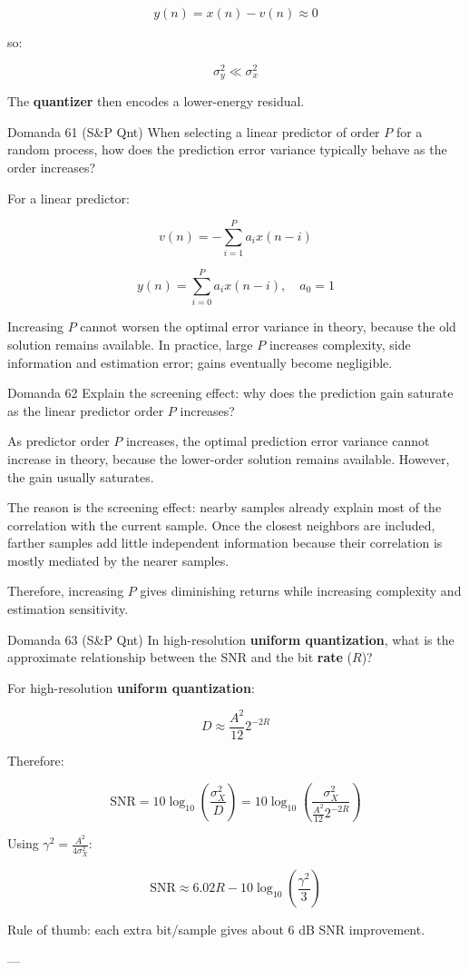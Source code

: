 $$
y(n)=x(n)-v(n)\approx 0
$$


so:


$$
\sigma_y^2 \ll \sigma_x^2
$$


The \textbf{quantizer} then encodes a lower-energy residual.



\begin{questionbox}{Domanda 61}
(S\&P Qnt) When selecting a linear predictor of order $P$ for a random process, how does the prediction error variance typically behave as the order increases?
\end{questionbox}


For a linear predictor:


$$
v(n)=-\sum_{i=1}^{P}a_i x(n-i)
$$



$$
y(n)=\sum_{i=0}^{P}a_i x(n-i),\quad a_0=1
$$


Increasing $P$ cannot worsen the optimal error variance in theory, because the old solution remains available. In practice, large $P$ increases complexity, side information and estimation error; gains eventually become negligible.



\begin{questionbox}{Domanda 62}
Explain the screening effect: why does the prediction gain saturate as the linear predictor order $P$ increases?
\end{questionbox}


As predictor order $P$ increases, the optimal prediction error variance cannot increase in theory, because the lower-order solution remains available. However, the gain usually saturates.

The reason is the screening effect: nearby samples already explain most of the correlation with the current sample. Once the closest neighbors are included, farther samples add little independent information because their correlation is mostly mediated by the nearer samples.

Therefore, increasing $P$ gives diminishing returns while increasing complexity and estimation sensitivity.



\begin{questionbox}{Domanda 63}
(S\&P Qnt) In high-resolution \textbf{uniform \textbf{quantization}}, what is the approximate relationship between the SNR and the bit \textbf{rate} ($R$)?
\end{questionbox}


For high-resolution \textbf{uniform \textbf{quantization}}:


$$
D \approx \frac{A^2}{12}2^{-2R}
$$


Therefore:


$$
\text{SNR}
=10\log_{10}\left(\frac{\sigma_X^2}{D}\right)
=10\log_{10}\left(\frac{\sigma_X^2}{\frac{A^2}{12}2^{-2R}}\right)
$$


Using $\gamma^2=\frac{A^2}{4\sigma_X^2}$:


$$
\text{SNR}\approx 6.02R - 10\log_{10}\left(\frac{\gamma^2}{3}\right)
$$


Rule of thumb: each extra bit/sample gives about $6$ dB SNR improvement.

---


